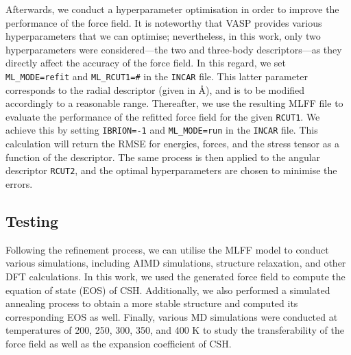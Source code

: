 Afterwards, we conduct a hyperparameter optimisation in order to improve the performance of the force field. It is noteworthy that VASP provides various hyperparameters that we can optimise; nevertheless, in this work, only two hyperparameters were considered---the two and three-body descriptors---as they directly affect the accuracy of the force field. In this regard, we set \texttt{ML\_MODE=refit} and \texttt{ML\_RCUT1=\#} in the \texttt{INCAR} file. This latter parameter corresponds to the radial descriptor (given in \AA), and is to be modified accordingly to a reasonable range. Thereafter, we use the resulting MLFF file to evaluate the performance of the refitted force field for the given \texttt{RCUT1}. We achieve this by setting \texttt{IBRION=-1} and \texttt{ML\_MODE=run} in the \texttt{INCAR} file. This calculation will return the RMSE for energies, forces, and the stress tensor as a function of the descriptor. The same process is then applied to the angular descriptor \texttt{RCUT2}, and the optimal hyperparameters are chosen to minimise the errors. 

\subsection{Testing}
Following the refinement process, we can utilise the MLFF model to conduct various simulations, including AIMD simulations, structure relaxation, and other DFT calculations. In this work, we used the generated force field to compute the equation of state (EOS) of CSH. Additionally, we also performed a simulated annealing process to obtain a more stable structure and computed its corresponding EOS as well. Finally, various MD simulations were conducted at temperatures of 200, 250, 300, 350, and 400 K to study the transferability of the force field as well as the expansion coefficient of CSH.